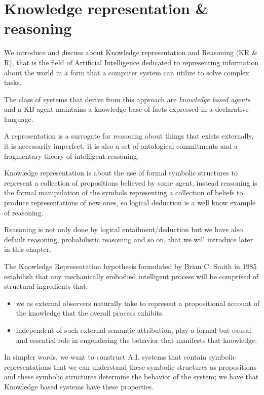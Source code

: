 \chapter{Knowledge representation \& reasoning}
We introduce and discuss about Knowledge representation and Reasoning (KR \& R), that
is the field of Artificial Intelligence dedicated to representing information about the 
world in a form that a computer system can utilize to solve complex tasks.

The class of systems that derive from this approach are \emph{knowledge based agents} and
a KB agent maintains a knowledge base of facts expressed in a declarative language.

A representation is a surrogate for reasoning about things that exists externally,
it is necessarily imperfect, it is also a set of ontological commitments and a fragmentary
theory of intelligent reasoning.

Knowledge representation is about the use of formal symbolic structures to represent a 
collection of propositions believed by some agent, instead reasoning is the formal
manipulation of the symbols representing a collection of beliefs to produce representations
of new ones, so logical deduction is a well know example of reasoning.

Reasoning is not only done by logical entailment/deduction but we have also default reasoning, probabilistic reasoning and so on, that we will introduce later in this chapter.

The Knowledge Representation hypothesis formulated by Brian C. Smith in 1985 estabilish 
that any mechanically embodied intelligent process will be comprised of structural
 ingredients that:
\begin{itemize}
   \item we as external observers naturally take to represent a propositional account
         of the knowledge that the overall process exhibits.
   \item independent of such external semantic attribution, play a formal but causal
         and essential role in engendering the behavior that manifests that knowledge.
\end{itemize}
In simpler words, we want to construct A.I. systems that contain symbolic
representations that we can understand these symbolic structures as propositions and 
these symbolic structures determine the behavior of the system; we have that 
Knowledge based systems have these properties.

